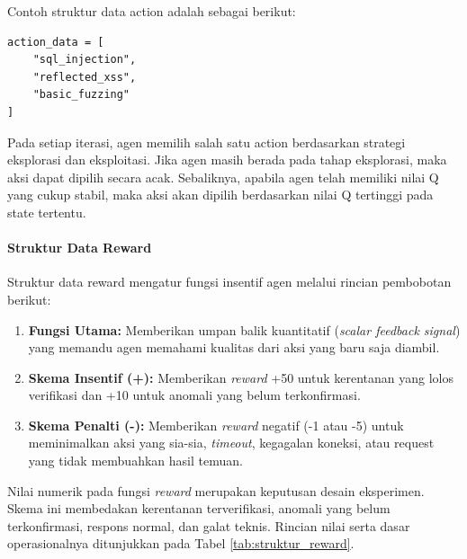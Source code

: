 Contoh struktur data action adalah sebagai berikut:

\begin{verbatim}
action_data = [
    "sql_injection",
    "reflected_xss",
    "basic_fuzzing"
]
\end{verbatim}

Pada setiap iterasi, agen memilih salah satu action berdasarkan strategi eksplorasi dan eksploitasi. Jika agen masih berada pada tahap eksplorasi, maka aksi dapat dipilih secara acak. Sebaliknya, apabila agen telah memiliki nilai Q yang cukup stabil, maka aksi akan dipilih berdasarkan nilai Q tertinggi pada state tertentu.

\paragraph{Struktur Data Reward}

Struktur data reward mengatur fungsi insentif agen melalui rincian pembobotan berikut:

\begin{enumerate}
    \item \textbf{Fungsi Utama:} Memberikan umpan balik kuantitatif (\textit{scalar feedback signal}) yang memandu agen memahami kualitas dari aksi yang baru saja diambil.
    \item \textbf{Skema Insentif (+):} Memberikan \textit{reward} +50 untuk kerentanan yang lolos verifikasi dan +10 untuk anomali yang belum terkonfirmasi.
    \item \textbf{Skema Penalti (-):} Memberikan \textit{reward} negatif (-1 atau -5) untuk meminimalkan aksi yang sia-sia, \textit{timeout}, kegagalan koneksi, atau request yang tidak membuahkan hasil temuan.
\end{enumerate}

Nilai numerik pada fungsi \textit{reward} merupakan keputusan desain eksperimen. Skema ini membedakan kerentanan terverifikasi, anomali yang belum terkonfirmasi, respons normal, dan galat teknis. Rincian nilai serta dasar operasionalnya ditunjukkan pada Tabel \ref{tab:struktur_reward}.

